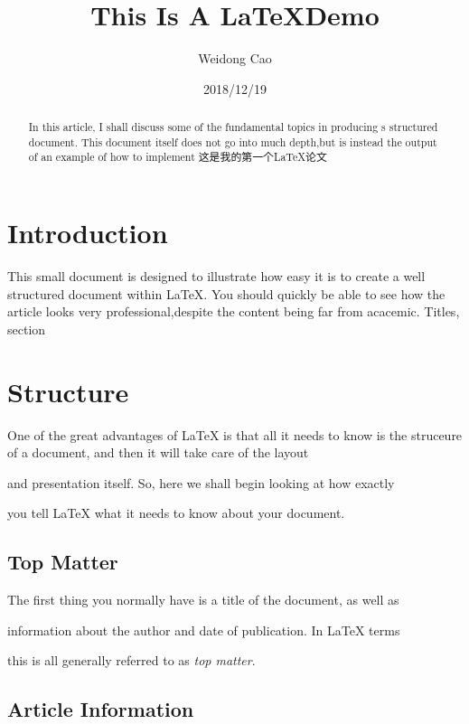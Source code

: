 \documentclass{article}
\begin{document}
\title{This Is A \LaTeX Demo}
\author{Weidong Cao}
\date{2018/12/19}
\maketitle
\begin{abstract}
  In this article, I shall discuss some of the fundamental topics in
  producing s structured document. This document itself does not go into
  much depth,but is instead the output of an example of how to implement
  这是我的第一个LaTeX论文
\end{abstract}

\section{Introduction}

This small document is designed to illustrate how easy it is to create a well structured
document within \LaTeX{}. You should quickly be able to see how the article
looks very professional,despite the content being far from acacemic. Titles, section

\section{Structure}

One of the great advantages of \LaTeX{} is that all it needs to know is
the struceure of a document, and then it will take care of the layout

and presentation itself. So, here we shall begin looking at how exactly

you tell \LaTeX{} what it needs to know about your document.

\subsection{Top Matter}

\label{sec:top-matter}

The first thing you normally have is a title of the document, as well as

information about the author and date of publication. In \LaTeX{} terms

this is all generally referred to as \emph{top matter}.

\subsection{Article Information}
\end{document}
